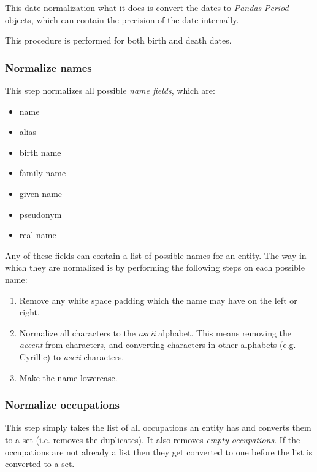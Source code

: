 \documentclass[epsfig,a4paper,11pt,titlepage,twoside,openany]{book}
\begin{document}
This date normalization what it does is convert the dates to \textit{Pandas} \cite{mckinney2010_pandas} \textit{Period} objects, which can contain the precision of the date internally. 

This procedure is performed for both birth and death dates.


\subsubsection{Normalize names}
\label{sec:data-preprocessiong-name-normalization}

This step normalizes all possible \textit{name fields}, which are: 

\begin{itemize}
    \item name
    \item alias
    \item birth name
    \item family name
    \item given name
    \item pseudonym
    \item real name
\end{itemize}

Any of these fields can contain a list of possible names for an entity. The way in which they are normalized is by performing the following steps on each possible name:

\begin{enumerate}
    \item Remove any white space padding which the name may have on the left or right.
    
    \item Normalize all characters to the \textit{ascii} alphabet. This means removing the \textit{accent} from characters, and converting characters in other alphabets (e.g. Cyrillic) to \textit{ascii} characters.

    \item Make the name lowercase.
\end{enumerate}

\subsubsection{Normalize occupations}
\label{sec:data-preprocessiong-occupations-normalization}

This step simply takes the list of all occupations an entity has and converts them to a set (i.e. removes the duplicates). It also removes \textit{empty occupations}. If the occupations are not already a list then they get converted to one before the list is converted to a set.
\end{document}
